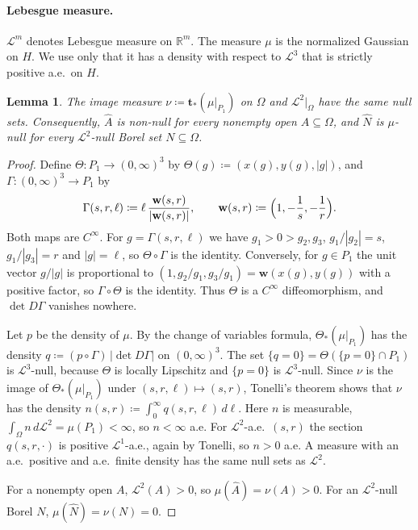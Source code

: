 \documentclass[11pt]{article}
\newtheorem{lemma}[theorem]{Lemma}
\theoremstyle{definition}\newtheorem{definition}[theorem]{Definition}
\theoremstyle{remark}\newtheorem{remark}[theorem]{Remark}
\begin{document}
\paragraph{Lebesgue measure.} $\mathcal L^m$ denotes Lebesgue measure on
$\mathbb R^m$. The measure $\mu$ is the normalized Gaussian on $H$. We use
only that it has a density with respect to $\mathcal L^3$ that is strictly
positive a.e.\ on $H$.

\begin{lemma}\label{lem:sep-push}
The image measure $\nu\coloneqq\mathbf t_*(\mu|_{P_1})$ on $\Omega$ and
$\mathcal L^2|_\Omega$ have the same null sets. Consequently, $\widehat A$ is
non-null for every nonempty open $A\subseteq\Omega$, and $\widehat N$ is
$\mu$-null for every $\mathcal L^2$-null Borel set $N\subseteq\Omega$.
\end{lemma}

\begin{proof}
Define $\Theta\colon P_1\to(0,\infty)^3$ by
$\Theta(g)\coloneqq(x(g),y(g),|g|)$, and
$\Gamma\colon(0,\infty)^3\to P_1$ by
\[
 \Gamma(s,r,\ell)\coloneqq\ell\,\frac{\mathbf w(s,r)}{|\mathbf w(s,r)|},\qquad
 \mathbf w(s,r)\coloneqq\Bigl(1,-\frac1s,-\frac1r\Bigr).
\]
Both maps are $C^\infty$. For $g=\Gamma(s,r,\ell)$ we have $g_1>0>g_2,g_3$,
$g_1/|g_2|=s$, $g_1/|g_3|=r$ and $|g|=\ell$, so $\Theta\circ\Gamma$ is the
identity. Conversely, for $g\in P_1$ the unit vector $g/|g|$ is proportional
to $(1,g_2/g_1,g_3/g_1)=\mathbf w(x(g),y(g))$ with a positive factor, so
$\Gamma\circ\Theta$ is the identity. Thus $\Theta$ is a $C^\infty$
diffeomorphism, and $\det D\Gamma$ vanishes nowhere.

Let $p$ be the density of $\mu$. By the change of variables formula,
$\Theta_*(\mu|_{P_1})$ has the density
$q\coloneqq(p\circ\Gamma)\,|\det D\Gamma|$ on $(0,\infty)^3$. The set
$\{q=0\}=\Theta(\{p=0\}\cap P_1)$ is $\mathcal L^3$-null, because $\Theta$ is
locally Lipschitz and $\{p=0\}$ is $\mathcal L^3$-null. Since $\nu$ is the
image of $\Theta_*(\mu|_{P_1})$ under $(s,r,\ell)\mapsto(s,r)$, Tonelli's
theorem shows that $\nu$ has the density
$n(s,r)\coloneqq\int_0^\infty q(s,r,\ell)\,d\ell$. Here $n$ is measurable,
$\int_\Omega n\,d\mathcal L^2=\mu(P_1)<\infty$, so $n<\infty$ a.e. For
$\mathcal L^2$-a.e.\ $(s,r)$ the section $q(s,r,\cdot)$ is positive
$\mathcal L^1$-a.e., again by Tonelli, so $n>0$ a.e. A measure with an
a.e.\ positive and a.e.\ finite density has the same null sets as
$\mathcal L^2$.

For a nonempty open $A$, $\mathcal L^2(A)>0$, so
$\mu(\widehat A)=\nu(A)>0$. For an $\mathcal L^2$-null Borel $N$,
$\mu(\widehat N)=\nu(N)=0$.
\end{proof}
\end{document}
